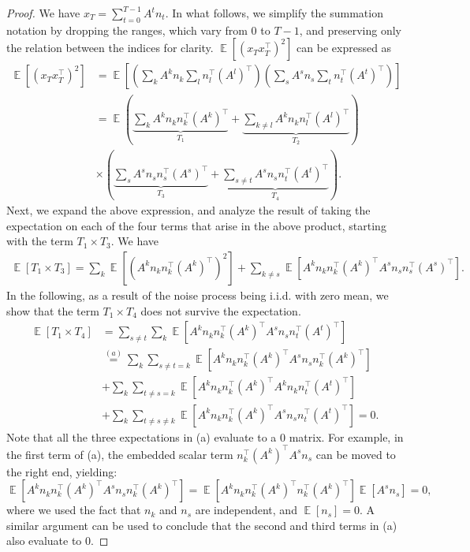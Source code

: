 \documentclass[letterpaper, 11 pt]{article}
\DeclareMathOperator{\E}{\mathbb{E}}
\begin{document}
\begin{proof}
    We have $x_T = \sum_{t = 0}^{T-1} A^tn_t$. In what follows, we simplify the summation notation by dropping the ranges, which vary from $0$ to $T-1$, and preserving only the relation between the indices for clarity. $\E\left[(x_Tx_T^{\top})^2\right]$ can be expressed as
    \begin{align*}
        \E\left[(x_Tx_T^{\top})^2\right] &= \E\left[ \left( \sum_{k}A^kn_k \sum_{l}n_l^{\top}(A^l)^{\top} \right) \left( \sum_{s}A^sn_s \sum_{t}n_t^{\top}(A^t)^{\top} \right)\right] \\
        &= \E \left( \underbrace{\sum_k A^kn_kn_k^{\top}(A^k)^{\top}}_{T_1} + \underbrace{\sum_{k\neq l} A^kn_kn_l^{\top}(A^l)^{\top}}_{T_2} \right) \\
        & \times \left( \underbrace{\sum_s A^sn_sn_s^{\top}(A^s)^{\top}}_{T_3} + \underbrace{\sum_{s\neq t} A^sn_sn_t^{\top}(A^t)^{\top}}_{T_4} \right).
    \end{align*}
    Next, we expand the above expression, and analyze the result of taking the expectation on each of the four terms that arise in the above product, starting with the term $T_1 \times T_3.$ We have 
    \begin{align*}
        \E[T_1 \times T_3] = \sum_{k} \E\left[(A^kn_kn_k^{\top}(A^k)^{\top})^2\right] + \sum_{k\neq s} \E\left[ A^kn_kn_k^{\top}(A^k)^{\top} A^sn_sn_s^{\top}(A^s)^{\top}\right]. 
    \end{align*}
    In the following, as a result of the noise process being i.i.d. with zero mean, we show that the term $T_1 \times T_4$ does not survive the expectation.
    \begin{align*}
        \E[T_1 \times T_4] & = \sum_{s \neq t} \sum_k \E\left[ A^kn_kn_k^{\top}(A^k)^{\top} A^sn_sn_t^{\top}(A^t)^{\top}\right] \\
        & \overset{(a)}{=}  \sum_k \sum_{s \neq t = k} \E\left[ A^kn_kn_k^{\top}(A^k)^{\top} A^sn_sn_k^{\top}(A^k)^{\top}\right] \\
        & + \sum_k \sum_{t \neq s = k} \E\left[ A^kn_kn_k^{\top}(A^k)^{\top} A^kn_kn_t^{\top}(A^t)^{\top}\right] \\
        & + \sum_k \sum_{t \neq s \neq k} \E\left[ A^kn_kn_k^{\top}(A^k)^{\top} A^sn_sn_t^{\top}(A^t)^{\top}\right] = 0.
    \end{align*}
    Note that all the three expectations in (a) evaluate to a $0$ matrix. For example, in the first term of (a), the embedded scalar term $n_k^{\top}(A^k)^{\top} A^sn_s$ can be moved to the right end, yielding: 
    $$ \E\left[ A^kn_kn_k^{\top}(A^k)^{\top} A^sn_sn_k^{\top}(A^k)^{\top}\right] = \E\left[ A^kn_k n_k^{\top}(A^k)^{\top} n_k^{\top}(A^k)^{\top}\right]  \E\left[ A^sn_s \right] =0,$$
where we used the fact that $n_k$ and $n_s$ are independent, and $\E[n_s]=0.$ A similar argument can be used to conclude that the second and third terms in (a) also evaluate to $0$. 


\end{proof}
\end{document}
